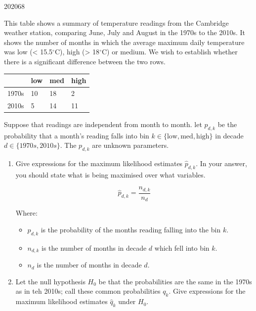 \documentclass[10pt,\jkfside,a4paper]{article}
\begin{document}
\begin{examquestion}{2020}{6}{8}

This table shows a summary of temperature readings from the Cambridge
weather station, comparing June, July and August in the 1970s to the 2010s.
It shows the number of months in which the average maximum daily temperature
was low (< 15.5$^\circ$C), high (> 18$^\circ$C) or medium. We wish to
establish whether there is a significant difference between the two rows.

\begin{table}[H]
\centering
\begin{tabular}{l l l l}
& low & med & high \\
\hline
1970s & 10 & 18 & 2 \\
2010s & 5 & 14 & 11 \\
\end{tabular}
\end{table}

Suppose that readings are independent from month to month. let $p_{d, k}$ be
the probability that a month's reading falls into bin $k \in \{\text{low},
\text{med}, \text{high}\}$ in decade $d \in \{1970s, 2010s\}$. The $p_{d,
k}$ are unknown parameters.

\begin{enumerate}[label=(\alph*)]

\item Give expressions for the maximum likelihood estimates $\hat{p}_{d, k}$.
In your answer, you should state what is being maximised over what variables.

\[
\hat{p}_{d,k} = \frac{n_{d,k}}{n_{d}}
\]

Where:

\begin{itemize}

\item $p_{d,k}$ is the probability of the months reading falling into the
bin $k$.

\item $n_{d,k}$ is the number of months in decade $d$ which fell into bin $k$.

\item $n_d$ is the number of months in decade $d$.

\end{itemize}

\item Let the null hypothesis $H_0$ be that the probabilities are the same
in the 1970s as in teh 2010s; call these common probabilities $q_k$. Give
expressions for the maximum likelihood estimates $\hat{q}_k$ under $H_0$.


\end{enumerate}
\end{examquestion}
\end{document}

